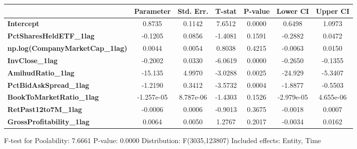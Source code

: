 \begin{center}
\begin{tabular}{lclc}
\bottomrule
\end{tabular}
\begin{tabular}{lcccccc}
                                        & \textbf{Parameter} & \textbf{Std. Err.} & \textbf{T-stat} & \textbf{P-value} & \textbf{Lower CI} & \textbf{Upper CI}  \\
\midrule
\textbf{Intercept}                      &       0.8735       &       0.1142       &      7.6512     &      0.0000      &       0.6498      &       1.0973       \\
\textbf{PctSharesHeldETF\_1lag}         &      -0.1205       &       0.0856       &     -1.4081     &      0.1591      &      -0.2882      &       0.0472       \\
\textbf{np.log(CompanyMarketCap\_1lag)} &       0.0044       &       0.0054       &      0.8038     &      0.4215      &      -0.0063      &       0.0150       \\
\textbf{InvClose\_1lag}                 &      -0.2002       &       0.0330       &     -6.0619     &      0.0000      &      -0.2650      &      -0.1355       \\
\textbf{AmihudRatio\_1lag}              &      -15.135       &       4.9970       &     -3.0288     &      0.0025      &      -24.929      &      -5.3407       \\
\textbf{PctBidAskSpread\_1lag}          &      -1.2190       &       0.3412       &     -3.5732     &      0.0004      &      -1.8877      &      -0.5503       \\
\textbf{BookToMarketRatio\_1lag}        &     -1.257e-05     &     8.787e-06      &     -1.4303     &      0.1526      &     -2.979e-05    &     4.655e-06      \\
\textbf{RetPast12to7M\_1lag}            &      -0.0006       &       0.0006       &     -0.9013     &      0.3675      &      -0.0018      &       0.0007       \\
\textbf{GrossProfitability\_1lag}       &       0.0064       &       0.0050       &      1.2767     &      0.2017      &      -0.0034      &       0.0162       \\
\bottomrule
\end{tabular}
\end{center}

F-test for Poolability: 7.6661 \newline
 P-value: 0.0000 \newline
 Distribution: F(3035,123807) \newline
  \newline
 Included effects: Entity, Time
